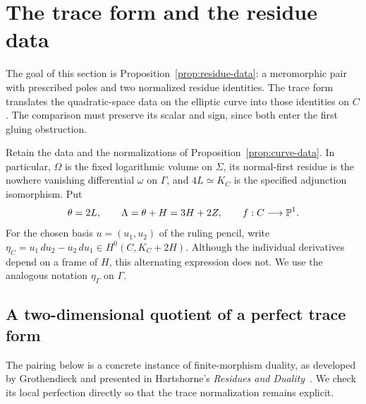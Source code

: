 \section{The trace form and the residue data}
\label{trace:section}

The goal of this section is Proposition~\ref{prop:residue-data}: a
meromorphic pair with prescribed poles and two normalized residue
identities. The trace form translates the quadratic-space data on the
elliptic curve into those identities on $C$. The comparison must preserve
its scalar and sign, since both enter the first gluing obstruction.

Retain the data and the normalizations of Proposition~\ref{prop:curve-data}.
In particular, $\Omega$ is the fixed logarithmic volume on $\Sigma$, its
normal-first residue is the nowhere vanishing differential $\omega$ on
$\Gamma$, and $4L\simeq K_C$ is the specified adjunction isomorphism.
Put
\[
 \theta=2L,\qquad \Lambda=\theta+H=3H+2Z,
 \qquad f:C\longrightarrow\mathbb P^1.
\]
For the chosen basis $u=(u_1,u_2)$ of the ruling pencil, write
$\eta_C=u_1\,du_2-u_2\,du_1\in H^0(C,K_C+2H)$.
Although the individual derivatives depend on a frame of $H$, this
alternating expression does not.  We use the analogous notation
$\eta_\Gamma$ on $\Gamma$.

\subsection{A two-dimensional quotient of a perfect trace form}

The pairing below is a concrete instance of finite-morphism duality,
as developed by Grothendieck and presented in Hartshorne's
\emph{Residues and Duality}~\cite[Chapter~III, \S6]{Hartshorne1966}. We check its local
perfection directly so that the trace normalization remains explicit.

